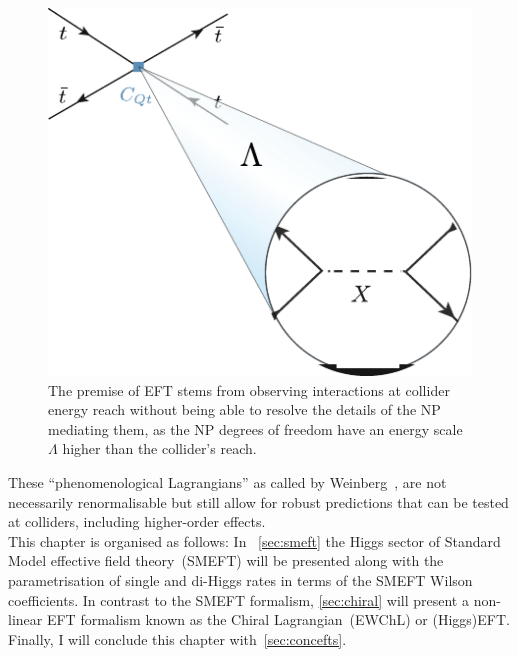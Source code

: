 \begin{figure}[h!]
	\begin{center}
		\includegraphics[width=.4 \linewidth]{figures/EFT}
		\caption{The premise of EFT stems from observing interactions at collider energy reach without being able to resolve the details of the NP mediating them, as the NP degrees of freedom have an energy scale $\Lambda$ higher than the collider's reach. }
		\label{fig:eft}
	\end{center}
\end{figure}
These ``phenomenological Lagrangians'' as called by Weinberg~\cite{WEINBERG1979327}, are not necessarily renormalisable but still allow for robust predictions that can be tested at colliders, including higher-order effects. \\
This chapter is organised as follows:  In ~\autoref{sec:smeft} the Higgs sector of Standard Model effective field theory~(SMEFT) will be presented along with the parametrisation of single and di-Higgs rates in terms of the SMEFT Wilson coefficients. In contrast to the SMEFT formalism, \autoref{sec:chiral} will present a non-linear EFT formalism known as the Chiral Lagrangian~(EWChL) or (Higgs)EFT. Finally, I will conclude this chapter with~\autoref{sec:concefts}.
